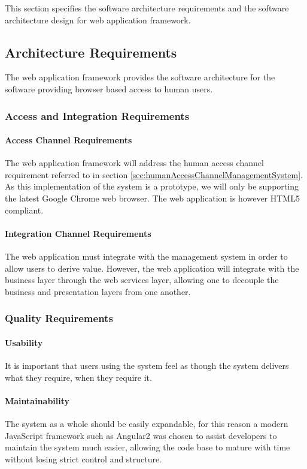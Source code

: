 This section specifies the software architecture requirements and the software
architecture design for web application framework.

\subsection{Architecture Requirements}
The web application framework provides the software architecture for the software
providing browser based access to human users.

\subsubsection{Access and Integration Requirements}
\paragraph*{Access Channel Requirements}
The web application framework will address the human access channel requirement
referred to in section \ref{sec:humanAccessChannelManagementSystem}. As this 
implementation of the system is a prototype, we will only be supporting the
latest Google Chrome web browser. The web application is however HTML5 compliant.

\paragraph*{Integration Channel Requirements}
The web application must integrate with the management system in order to allow
users to derive value. However, the web application will integrate with the
business layer through the web services layer, allowing one to decouple the
business and presentation layers from one another.

\subsubsection{Quality Requirements}
\paragraph*{Usability}
It is important that users using the system feel as though the system delivers
what they require, when they require it.

\paragraph*{Maintainability}
The system as a whole should be easily expandable, for this reason a modern
JavaScript framework such as Angular2 was chosen to assist developers
to maintain the system much easier, allowing the code base to mature
with time without losing strict control and structure.



